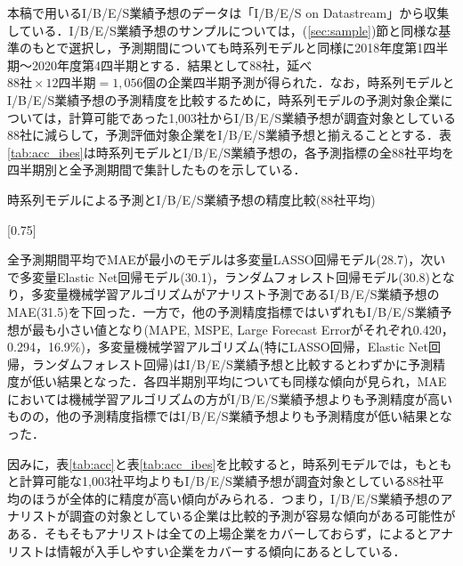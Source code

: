 \documentclass[a4paper，12pt]{jsarticle}
\begin{document}
本稿で用いるI/B/E/S業績予想のデータは「I/B/E/S on Datastream」から収集している．I/B/E/S業績予想のサンプルについては，(\ref{sec:sample})節と同様な基準のもとで選択し，予測期間についても時系列モデルと同様に2018年度第1四半期～2020年度第4四半期とする．結果として88社，延べ $88社 \times 12四半期 = 1,056個$の企業四半期予測が得られた．なお，時系列モデルとI/B/E/S業績予想の予測精度を比較するために，時系列モデルの予測対象企業については，計算可能であった1,003社からI/B/E/S業績予想が調査対象としている88社に減らして，予測評価対象企業をI/B/E/S業績予想と揃えることとする．表\ref{tab:acc_ibes}は時系列モデルとI/B/E/S業績予想の，各予測指標の全88社平均を四半期別と全予測期間で集計したものを示している．

\begin{landscape}
\begin{table}
    \caption{時系列モデルによる予測とI/B/E/S業績予想の精度比較(88社平均)}
    \label{tab:acc_ibes}
    \scalebox{0.75}[0.75]{
      
    }
\end{table}
\end{landscape}

全予測期間平均でMAEが最小のモデルは多変量LASSO回帰モデル(28.7)，次いで多変量Elastic Net回帰モデル(30.1)，ランダムフォレスト回帰モデル(30.8)となり，多変量機械学習アルゴリズムがアナリスト予測であるI/B/E/S業績予想のMAE(31.5)を下回った．一方で，他の予測精度指標ではいずれもI/B/E/S業績予想が最も小さい値となり(MAPE, MSPE, Large Forecast Errorがそれぞれ0.420，0.294，16.9\%)，多変量機械学習アルゴリズム(特にLASSO回帰，Elastic Net回帰，ランダムフォレスト回帰)はI/B/E/S業績予想と比較するとわずかに予測精度が低い結果となった．各四半期別平均についても同様な傾向が見られ，MAEにおいては機械学習アルゴリズムの方がI/B/E/S業績予想よりも予測精度が高いものの，他の予測精度指標ではI/B/E/S業績予想よりも予測精度が低い結果となった．


因みに，表\ref{tab:acc}と表\ref{tab:acc_ibes}を比較すると，時系列モデルでは，もともと計算可能な1,003社平均よりもI/B/E/S業績予想が調査対象としている88社平均のほうが全体的に精度が高い傾向がみられる．つまり，I/B/E/S業績予想のアナリストが調査の対象としている企業は比較的予測が容易な傾向がある可能性がある．そもそもアナリストは全ての上場企業をカバーしておらず，\cite{nakai2006}によるとアナリストは情報が入手しやすい企業をカバーする傾向にあるとしている．
\end{document}
